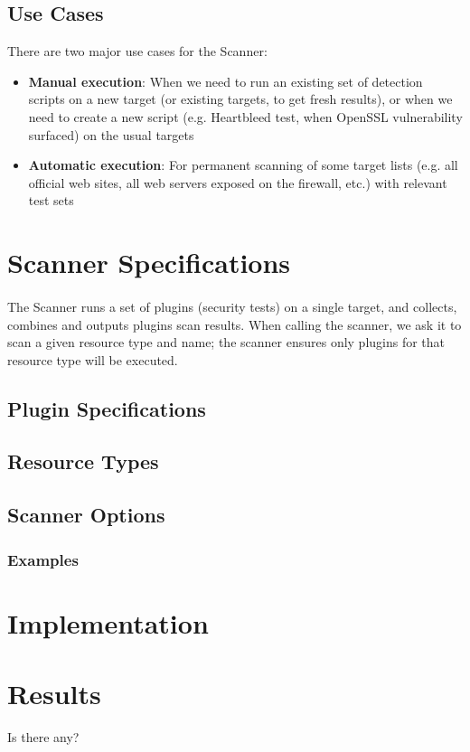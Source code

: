 \subsection{Use Cases}
There are two major use cases for the Scanner:
\begin{itemize}
\item \textbf{Manual execution}: When we need to run an existing set of detection scripts on a new target (or existing targets, to get fresh results), or when we need to create a new script (e.g. Heartbleed test, when OpenSSL vulnerability surfaced) on the usual targets
\item \textbf{Automatic execution}: For permanent scanning of some target lists (e.g. all official web sites, all web servers exposed on the firewall, etc.) with relevant test sets
\end{itemize}

\section{Scanner Specifications}

\paragraph{}
The Scanner runs a set of plugins (security tests) on a single target, and collects, combines and outputs plugins scan results. 
When calling the scanner, we ask it to scan a given resource type and name; the scanner ensures only plugins for that resource type will be executed. 

\subsection{Plugin Specifications}
\subsection{Resource Types}
\subsection{Scanner Options}
\subsubsection{Examples}

\section{Implementation}
\section{Results}
Is there any?



